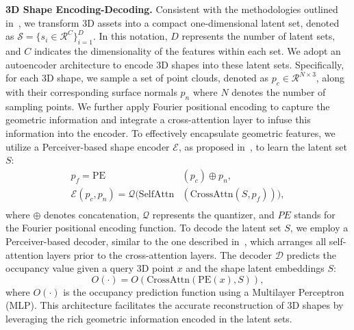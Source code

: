 \noindent\textbf{3D Shape Encoding-Decoding.}
Consistent with the methodologies outlined in~\cite{3dshape2vecset,craftsman,clay}, we transform 3D assets into a compact one-dimensional latent set, denoted as $\mathcal{S} = \{s_i \in \mathcal{R}^C\}_{i=1}^D$. In this notation, $D$ represents the number of latent sets, and $C$ indicates the dimensionality of the features within each set. We adopt an autoencoder architecture to encode 3D shapes into these latent sets. Specifically, for each 3D shape, we sample a set of point clouds, denoted as $p_c \in \mathcal{R}^{N \times 3}$, along with their corresponding surface normals $p_n$ where $N$  denotes the number of sampling points. We further apply Fourier positional encoding to capture the geometric information and integrate a cross-attention layer to infuse this information into the encoder. To effectively encapsulate geometric features, we utilize a Perceiver-based shape encoder $\mathcal{E}$, as proposed in~\cite{3dshape2vecset,craftsman}, to learn the latent set $S$:
\begin{equation}
\begin{aligned}
        p_f = \mathrm{PE}&(p_c) \oplus p_n, \\
    \mathcal{E}(p_c,p_n) = \mathcal{Q}(\mathrm{SelfAttn}&(\mathrm{CrossAttn}(S, p_f))), \\
\end{aligned}
\end{equation}
where $\oplus$ denotes concatenation, $\mathcal{Q}$ represents the quantizer, and $PE$ stands for the Fourier positional encoding function. To decode the latent set $S$, we employ a Perceiver-based decoder, similar to the one described in~\cite{craftsman}, which arranges all self-attention layers prior to the cross-attention layers. The decoder $\mathcal{D}$ predicts the occupancy value given a query 3D point $x$ and the shape latent embeddings $S$:
\begin{equation}
    O(\cdot) = O(\mathrm{CrossAttn}(\mathrm{PE}(x), S)),
\end{equation}
where $O(\cdot)$ is the occupancy prediction function using a Multilayer Perceptron (MLP). This architecture facilitates the accurate reconstruction of 3D shapes by leveraging the rich geometric information encoded in the latent sets.


